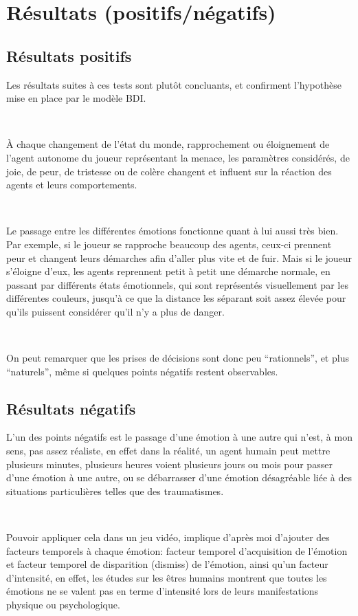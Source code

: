 \section{Résultats (positifs/négatifs)}

\subsection{Résultats positifs}

Les résultats suites à ces tests sont plutôt concluants, et confirment l’hypothèse mise en place par le modèle BDI.


~\par
À chaque changement de l’état du monde, rapprochement ou éloignement de l’agent autonome du joueur représentant la menace, les paramètres considérés, de joie, de peur, de tristesse ou de colère changent et influent sur la réaction des agents et leurs comportements.


~\par
Le passage entre les différentes émotions fonctionne quant à lui aussi très bien. Par exemple, si le joueur se rapproche beaucoup des agents, ceux-ci prennent peur et changent leurs démarches afin d’aller plus vite et de fuir. Mais si le joueur s’éloigne d’eux, les agents reprennent petit à petit une démarche normale, en passant par différents états émotionnels, qui sont représentés visuellement par les différentes couleurs, jusqu’à ce que la distance les séparant soit assez élevée pour qu’ils puissent considérer qu’il n’y a plus de danger.


~\par
On peut remarquer que les prises de décisions sont donc peu “rationnels”, et plus “naturels”, même si quelques points négatifs restent observables.

\subsection{Résultats négatifs}

L’un des points négatifs est le passage d’une émotion à une autre qui n’est, à mon sens, pas assez réaliste, en effet dans la réalité, un agent humain peut mettre plusieurs minutes, plusieurs heures voient plusieurs jours ou mois pour passer d’une émotion à une autre, ou se débarrasser d’une émotion désagréable liée à des situations particulières telles que des traumatismes.

~\par
Pouvoir appliquer cela dans un jeu vidéo, implique d'après moi d’ajouter des facteurs temporels à chaque émotion: facteur temporel d'acquisition de l’émotion et facteur temporel de disparition (dismiss) de l’émotion, ainsi qu'un facteur d’intensité, en effet, les études sur les êtres humains montrent que toutes les émotions ne se valent pas en terme d’intensité lors de leurs manifestations physique ou psychologique.


